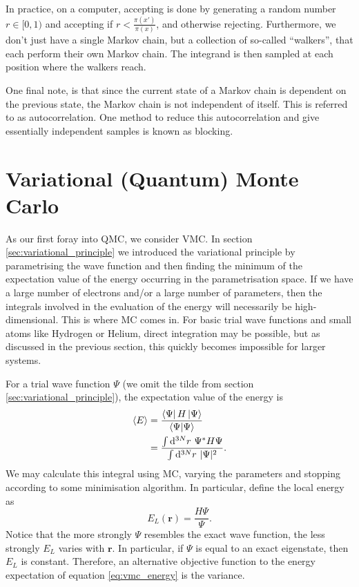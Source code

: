 In practice, on a computer, accepting is done by generating a random number $r\in [0,1)$ and accepting if $r<\frac{\pi(x')}{\pi(x)}$, and otherwise rejecting. Furthermore, we don't just have a single Markov chain, but a collection of so-called ``walkers'', that each perform their own Markov chain. The integrand is then sampled at each position where the walkers reach.

One final note, is that since the current state of a Markov chain is dependent on the previous state, the Markov chain is not independent of itself. This is referred to as autocorrelation. One method to reduce this autocorrelation and give essentially independent samples is known as blocking.

\section{Variational (Quantum) Monte Carlo}
\label{sec:vmc}

As our first foray into \gls{QMC}, we consider \gls{VMC}. In section \ref{sec:variational_principle} we introduced the variational principle by parametrising the wave function and then finding the minimum of the expectation value of the energy occurring in the parametrisation space. If we have a large number of electrons and/or a large number of parameters, then the integrals involved in the evaluation of the energy will necessarily be high-dimensional. This is where \gls{MC} comes in. For basic trial wave functions and small atoms like Hydrogen or Helium, direct integration may be possible, but as discussed in the previous section, this quickly becomes impossible for larger systems.

For a trial wave function $\Psi$ (we omit the tilde from section \ref{sec:variational_principle}), the expectation value of the energy is
\begin{align}
    \label{eq:vmc_energy}
    \langle E \rangle &= \frac{\bra{\Psi}H\ket{\Psi}}{\bra{\Psi}\ket{\Psi}} \\
    &= \frac{\int\mathrm{d}^{3N}r\ \Psi^*H\Psi}{\int\mathrm{d}^{3N}r\ |\Psi|^2}.
\end{align}
We may calculate this integral using \gls{MC}, varying the parameters and stopping according to some minimisation algorithm. In particular, define the local energy as
\begin{equation}
    E_L(\bm r) = \frac{H\Psi}{\Psi}.
\end{equation}
Notice that the more strongly $\Psi$ resembles the exact wave function, the less strongly $E_L$ varies with $\bm r$. In particular, if $\Psi$ is equal to an exact eigenstate, then $E_L$ is constant. Therefore, an alternative objective function to the energy expectation of equation \ref{eq:vmc_energy} is the variance.

